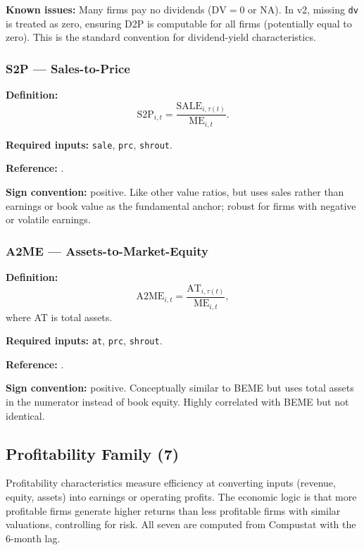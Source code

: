 \textbf{Known issues:} Many firms pay no dividends ($\mathrm{DV} = 0$
or NA). In v2, missing \texttt{dv} is treated as zero, ensuring D2P is
computable for all firms (potentially equal to zero). This is the
standard convention for dividend-yield characteristics.

\subsubsection{S2P --- Sales-to-Price}

\textbf{Definition:}
\begin{equation}
\mathrm{S2P}_{i,t} = \frac{\mathrm{SALE}_{i,\tau(t)}}{\mathrm{ME}_{i,t}}.
\label{eq:s2p}
\end{equation}

\textbf{Required inputs:} \texttt{sale}, \texttt{prc}, \texttt{shrout}.

\textbf{Reference:} \cite{Barbee1996}.

\textbf{Sign convention:} positive. Like other value ratios, but uses
sales rather than earnings or book value as the fundamental anchor;
robust for firms with negative or volatile earnings.

\subsubsection{A2ME --- Assets-to-Market-Equity}

\textbf{Definition:}
\begin{equation}
\mathrm{A2ME}_{i,t} = \frac{\mathrm{AT}_{i,\tau(t)}}{\mathrm{ME}_{i,t}},
\label{eq:a2me}
\end{equation}
where AT is total assets.

\textbf{Required inputs:} \texttt{at}, \texttt{prc}, \texttt{shrout}.

\textbf{Reference:} \cite{BharyMcLean2014}.

\textbf{Sign convention:} positive. Conceptually similar to BEME but
uses total assets in the numerator instead of book equity. Highly
correlated with BEME but not identical.

\subsection{Profitability Family (7)}
\label{subsec:stage0-profitability}

Profitability characteristics measure efficiency at converting inputs
(revenue, equity, assets) into earnings or operating profits. The
economic logic is that more profitable firms generate higher returns
than less profitable firms with similar valuations, controlling for
risk. All seven are computed from Compustat with the 6-month lag.

